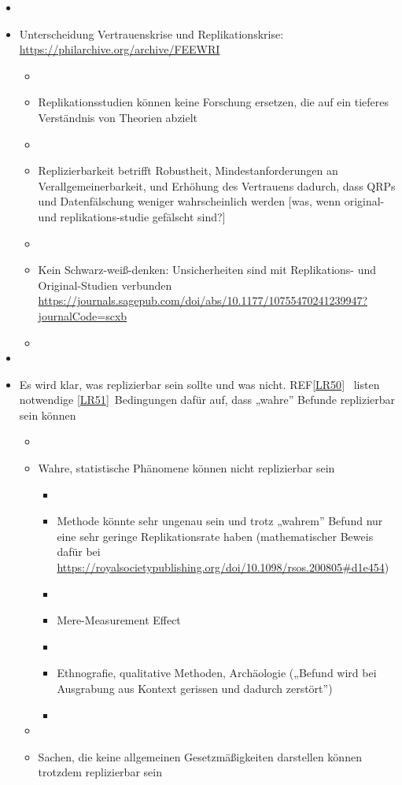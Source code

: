 \documentclass[
  letterpaper,
  DIV=11,
  numbers=noendperiod]{scrreprt}
\begin{document}
\begin{itemize}
\item
\item
  Unterscheidung Vertrauenskrise und Replikationskrise:
  \url{https://philarchive.org/archive/FEEWRI}

  \begin{itemize}
  \item
  \item
    Replikationsstudien können keine Forschung ersetzen, die auf ein
    tieferes Verständnis von Theorien abzielt
  \item
  \item
    Replizierbarkeit betrifft Robustheit, Mindestanforderungen an
    Verallgemeinerbarkeit, und Erhöhung des Vertrauens dadurch, dass
    QRPs und Datenfälschung weniger wahrscheinlich werden {[}was, wenn
    original- und replikations-studie gefälscht sind?{]}
  \item
  \item
    Kein Schwarz-weiß-denken: Unsicherheiten sind mit Replikations- und
    Original-Studien verbunden
    \url{https://journals.sagepub.com/doi/abs/10.1177/10755470241239947?journalCode=scxb}
  \item
  \end{itemize}
\item
\item
  Es wird klar, was replizierbar sein sollte und was nicht.
  REF\hyperref[_msocom_50]{{[}LR50{]}}~ listen notwendige
  \hyperref[_msocom_51]{{[}LR51{]}}~Bedingungen dafür auf, dass „wahre''
  Befunde replizierbar sein können

  \begin{itemize}
  \item
  \item
    Wahre, statistische Phänomene können nicht replizierbar sein

    \begin{itemize}
    \item
    \item
      Methode könnte sehr ungenau sein und trotz „wahrem'' Befund nur
      eine sehr geringe Replikationsrate haben (mathematischer Beweis
      dafür bei
      \url{https://royalsocietypublishing.org/doi/10.1098/rsos.200805\#d1e454})
    \item
    \item
      Mere-Measurement Effect
    \item
    \item
      Ethnografie, qualitative Methoden, Archäologie („Befund wird bei
      Ausgrabung aus Kontext gerissen und dadurch zerstört'')
    \item
    \end{itemize}
  \item
  \item
    Sachen, die keine allgemeinen Gesetzmäßigkeiten darstellen können
    trotzdem replizierbar sein


\end{itemize}
\end{itemize}
\end{document}
